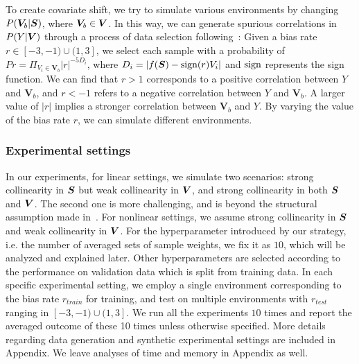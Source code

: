 To create covariate shift, we try to simulate various environments by changing $P(\boldsymbol{V}_b|\boldsymbol{S})$, where $\boldsymbol{V}_b\in \boldsymbol{V}$. In this way, we can generate spurious correlations in $P(Y|\boldsymbol{V})$ through a process of data selection following~\citet{kuang2020stable}: 
Given a bias rate $r\in[-3, -1)\cup(1,3]$, we select each sample with a probability of $Pr=\Pi_{V_i \in \boldsymbol{V}_b}|r|^{-5D_i}$, where $D_i=|f(\boldsymbol{S})-{\rm sign}(r)V_i|$ and ${\rm sign}$ represents the sign function.
We can find that $r>1$ corresponds to a positive correlation between $Y$ and $\boldsymbol{V}_b$, and $r<-1$ refers to a negative correlation between $Y$ and $\boldsymbol{V}_b$. 
A larger value of $|r|$ implies a stronger correlation between $\boldsymbol{V}_b$ and $Y$. By varying the value of the bias rate $r$, we can simulate different environments. 




\subsubsection{Experimental settings}
In our experiments, for linear settings, we simulate two scenarios: strong collinearity in $\boldsymbol{S}$ but weak collinearity in $\boldsymbol{V}$, and strong collinearity in both $\boldsymbol{S}$ and $\boldsymbol{V}$. The second one is more challenging, and is beyond the structural assumption made in~\citep{yu2023stable}. 
For nonlinear settings, we assume strong collinearity in $\boldsymbol{S}$ and weak collinearity in $\boldsymbol{V}$. 
For the hyperparameter introduced by our strategy, i.e. the number of averaged sets of sample weights, we fix it as $10$, which will be analyzed and explained later. 
Other hyperparameters are selected according to the performance on validation data which is split from training data. 
In each specific experimental setting, we employ a single environment corresponding to the bias rate $r_{train}$ for training, and test on multiple environments with $r_{test}$ ranging in $[-3, -1)\cup(1,3]$. 
We run all the experiments $10$ times and report the averaged outcome of these 10 times unless otherwise specified. 
More details regarding data generation and synthetic experimental settings are included in Appendix. We leave analyses of time and memory in Appendix as well. 






